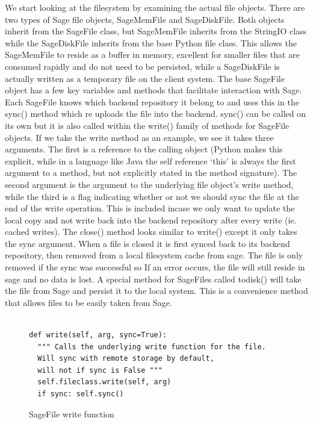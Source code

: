 We start looking at the filesystem by examining the actual file objects.
There are two types of Sage file objects, SageMemFile and SageDiskFile.  Both
objects inherit from the SageFile class, but SageMemFile inherits from  the
StringIO class while the SageDiskFile inherits from the base Python file
class. This allows the SageMemFile to reside as a buffer in memory, excellent
for smaller files that are consumed rapidly and do not need to be persisted,
while a SageDiskFile is actually written as a temporary file on the client
system.  The base SageFile object has a few key variables and methods that
facilitate interaction  with Sage. Each SageFile knows which backend
repository it belong to and uses this  in the sync() method which re uploads
the file into the backend. sync() can be called  on its own but it is also
called within the write() family of methods for SageFile  objects. If we take
the write method as an example, we see it takes three arguments.  The first is
a reference to the calling object (Python makes this explicit, while in  a
language like Java the self reference `this' is always the first argument to a
method,  but not explicitly stated in the method signature). The second
argument is the argument  to the underlying file object's write method, while
the third is a flag indicating whether  or not we should sync the file at the
end of the write operation. This is included incase  we only want to update
the local copy and not write back into the backend repository after  every
write (ie. cached writes). The close() method looks similar to write() except
it only  takes the sync argument. When a file is closed it is first synced
back to its backend  repository, then removed from a local filesystem cache
from sage. The file is only removed  if the sync was successful so If an error
occurs, the file will still reside in sage and no  data is lost. A special
method for SageFiles called todisk() will take the file from Sage  and persist
it to the local system. This is a convenience method that allows files to be
easily taken from Sage.

\begin{figure}[h]
\centering
\begin{lstlisting}

def write(self, arg, sync=True):
  """ Calls the underlying write function for the file.
  Will sync with remote storage by default, 
  will not if sync is False """
  self.fileclass.write(self, arg)
  if sync: self.sync()

\end{lstlisting}
\caption{SageFile write function}
\label{fig:sagefilewrite}
\end{figure}

